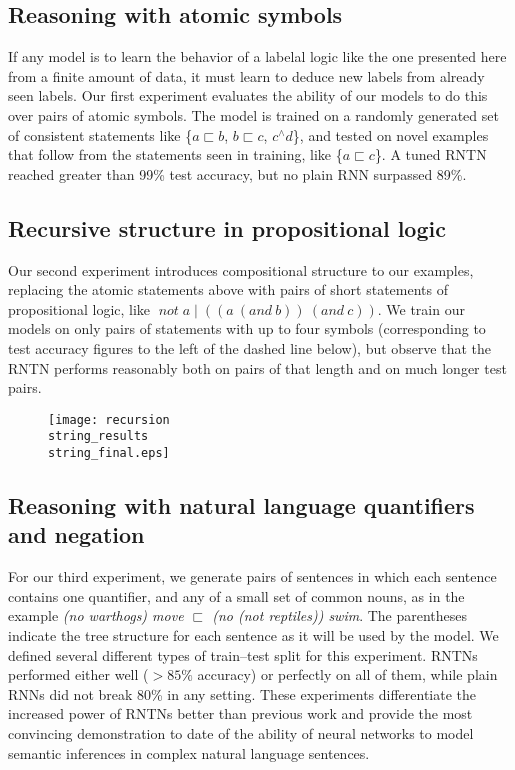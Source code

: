 \documentclass{article} %
\newcommand{\natneg}{\mathbin{^{\wedge}}}
\newcommand{\natfor}{\sqsubset}
\newcommand{\natalt}{\mathbin{|}}
\newcommand{\plneg}{\mathop{\textit{not}}}
\newcommand{\pland}{\mathbin{\textit{and}}}
\begin{document}
\subsection*{Reasoning with atomic symbols}

If any model is to learn the behavior of a labelal logic like the one presented here from a finite amount of data, it must learn to deduce new labels from already seen labels. Our first experiment evaluates the ability of our models to do this over pairs of atomic symbols. The model is trained on a randomly generated set of consistent statements like \{$a \natfor b$, $b \natfor c$, $c \natneg d$\}, and tested on novel examples that follow from the statements seen in training, like \{$a \natfor c$\}. A tuned RNTN reached greater than 99\% test accuracy, but no plain RNN surpassed 89\%.

\subsection*{Recursive structure in propositional logic}\label{sec:recursion}

Our second experiment introduces compositional structure to our examples, replacing the atomic statements above with pairs of short statements of propositional logic, like $\plneg a\natalt((a~(\pland~ b))~(\pland~c))$. We train our models on only pairs of statements with up to four symbols (corresponding to test accuracy figures to the left of the dashed line below), but observe that the RNTN performs reasonably both on pairs of that length and on much longer test pairs. 

\begin{figure}[h]
  \centering
  \texttt{[image: recursion\\string\_results\\string\_final.eps]}
  \label{prop-results}
\end{figure} \vspace{-.3cm}

\subsection*{Reasoning with natural language quantifiers and negation}\label{sec:quantifiers}

For our third experiment, we generate pairs of sentences in which each sentence contains one quantifier, and any of a small set of common nouns, as in the example \textit{(no warthogs) move $\natfor$ (no (not reptiles)) swim}. The parentheses indicate the tree structure for each sentence as it will be used by the model. We defined several different types of train--test split for this experiment. RNTNs performed either well ($>85\%$ accuracy) or perfectly on all of them, while plain RNNs did not break 80\% in any setting. These experiments differentiate the increased power of RNTNs better than previous work and provide the most convincing demonstration to date of the ability of neural networks to model semantic inferences in complex natural language sentences.




\small %
 
\end{document}
